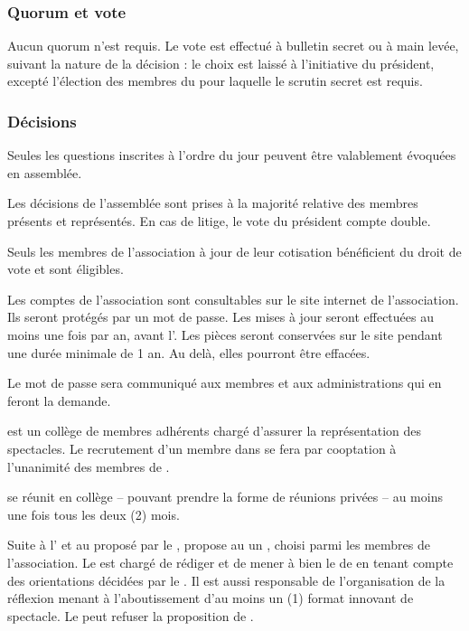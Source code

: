 \subsubsection*{Quorum et vote}

Aucun quorum n'est requis. Le vote est effectué à bulletin secret ou à
main levée, suivant la nature de la décision : le choix est laissé à
l'initiative du président, excepté l'élection des membres du \bureau{}
pour laquelle le scrutin secret est requis.


\subsubsection*{Décisions}

Seules les questions inscrites à l'ordre du jour peuvent être
valablement évoquées en assemblée.

Les décisions de l'assemblée sont prises à la majorité relative des
membres présents et représentés. En cas de litige, le vote du
président compte double.

Seuls les membres de l'association à jour de leur cotisation
bénéficient du droit de vote et sont éligibles.

\label{sec:transp-des-compt}
Les comptes de l'association sont consultables sur le site internet de l'association. Ils seront protégés par un mot de passe. Les mises à jour seront effectuées au moins une fois par an, avant l'\AGO{}. Les pièces seront conservées sur le site pendant une durée minimale de 1 an. Au delà, elles pourront être effacées.

Le mot de passe sera communiqué aux membres et aux administrations qui en feront la demande.

\label{sec:fonctionnement-troupe}
\troupe{} est un collège de membres adhérents chargé d'assurer la représentation des spectacles. Le recrutement d'un membre dans \troupe{} se fera par cooptation à l'unanimité des membres de \troupe{}.

 \troupe{} se réunit en collège -- pouvant prendre la forme de réunions privées -- au moins une fois tous les deux (2) mois.

Suite à l'\AGO{} et au \PA{} proposé par le \bureau{}, \troupe{} propose au \bureau{} un \DA{}, choisi parmi les membres de l'association. Le \DA{} est chargé de rédiger et de mener à bien le \PA{} de \troupe{} en tenant compte des orientations décidées par le \bureau{}. Il est aussi responsable de l'organisation de la réflexion menant à l'aboutissement d'au moins un (1) format innovant de spectacle. Le \bureau{} peut refuser la proposition de \troupe{}. 

